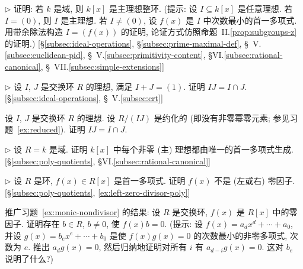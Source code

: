 \begin{prob}
\label{ex:kx-pid}
$\triangleright$ 证明: 若 $k$ 是域, 则 $k[x]$ 是主理想整环. (提示: 设 $I \subseteq k[x]$ 是任意理想. 若 $I = (0)$, 则 $I$ 是主理想. 若 $I \neq (0)$, 设 $f(x)$ 是 $I$ 中次数最小的首一多项式. 用带余除法构造 $I = (f(x))$ 的证明, 论证方式仿照命题~II.\ref{prop:subgroups-z} 的证明.) [\S\ref{subsec:ideal-operations}, \S\ref{subsec:prime-maximal-def}, \S~V.\ref{subsec:euclidean-pid}, \S~V.\ref{subsec:primitivity-content}, \S VI.\ref{subsec:rational-canonical}, \S~VII.\ref{subsec:simple-extensions}]
\end{prob}

\begin{prob}
\label{ex:IJ-coprime}
$\triangleright$ 设 $I$, $J$ 是交换环 $R$ 的理想, 满足 $I + J = (1)$. 证明 $IJ = I \cap J$. [\S\ref{subsec:ideal-operations}, \S~V.\ref{subsec:crt}]
\end{prob}

\begin{prob}
\label{ex:IJ-reduced}
设 $I$, $J$ 是交换环 $R$ 的理想. 设 $R/(IJ)$ 是约化的 (即没有非零幂零元素; 参见习题~\ref{ex:reduced}). 证明 $IJ = I \cap J$.
\end{prob}

\begin{prob}
\label{ex:monic-unique}
$\triangleright$ 设 $R = k$ 是域. 证明 $k[x]$ 中每个非零 (主) 理想都由唯一的首一多项式生成. [\S\ref{subsec:poly-quotients}, \S VI.\ref{subsec:rational-canonical}]
\end{prob}

\begin{prob}
\label{ex:monic-nondivisor}
$\triangleright$ 设 $R$ 是环, $f(x) \in R[x]$ 是首一多项式. 证明 $f(x)$ 不是 (左或右) 零因子. [\S\ref{subsec:poly-quotients}, \ref{ex:left-zero-divisor-poly}]
\end{prob}

\begin{prob}
\label{ex:left-zero-divisor-poly}
推广习题~\ref{ex:monic-nondivisor} 的结果: 设 $R$ 是交换环, $f(x)$ 是 $R[x]$ 中的零因子. 证明存在 $b \in R$, $b \neq 0$, 使 $f(x)b = 0$. (提示: 设 $f(x) = a_d x^d + \cdots + a_0$, 并设 $g(x) = b_e x^e + \cdots + b_0$ 是使 $f(x)g(x) = 0$ 的次数最小的非零多项式, 次数为 $e$. 推出 $a_d g(x) = 0$, 然后归纳地证明对所有 $i$ 有 $a_{d-i} g(x) = 0$. 这对 $b_e$ 说明了什么?)
\end{prob}

